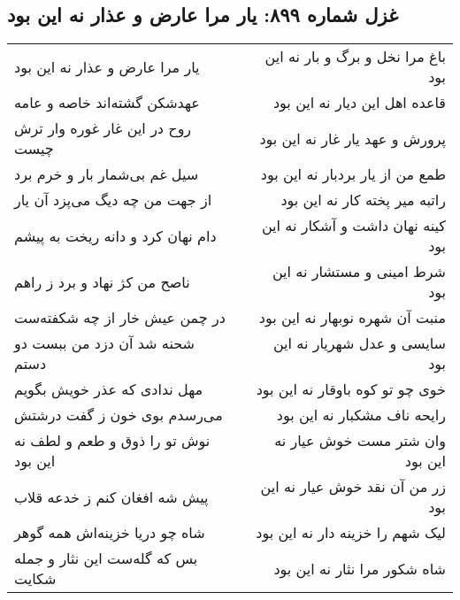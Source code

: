 \begin{center}
\section*{غزل شماره ۸۹۹: یار مرا عارض و عذار نه این بود}
\label{sec:0899}
\begin{longtable}{l p{0.5cm} r}
یار مرا عارض و عذار نه این بود
&&
باغ مرا نخل و برگ و بار نه این بود
\\
عهدشکن گشته‌اند خاصه و عامه
&&
قاعده اهل این دیار نه این بود
\\
روح در این غار غوره وار ترش چیست
&&
پرورش و عهد یار غار نه این بود
\\
سیل غم بی‌شمار بار و خرم برد
&&
طمع من از یار بردبار نه این بود
\\
از جهت من چه دیگ می‌پزد آن یار
&&
راتبه میر پخته کار نه این بود
\\
دام نهان کرد و دانه ریخت به پیشم
&&
کینه نهان داشت و آشکار نه این بود
\\
ناصح من کژ نهاد و برد ز راهم
&&
شرط امینی و مستشار نه این بود
\\
در چمن عیش خار از چه شکفته‌ست
&&
منبت آن شهره نوبهار نه این بود
\\
شحنه شد آن دزد من ببست دو دستم
&&
سایسی و عدل شهریار نه این بود
\\
مهل ندادی که عذر خویش بگویم
&&
خوی چو تو کوه باوقار نه این بود
\\
می‌رسدم بوی خون ز گفت درشتش
&&
رایحه ناف مشکبار نه این بود
\\
نوش تو را ذوق و طعم و لطف نه این بود
&&
وان شتر مست خوش عیار نه این بود
\\
پیش شه افغان کنم ز خدعه قلاب
&&
زر من آن نقد خوش عیار نه این بود
\\
شاه چو دریا خزینه‌اش همه گوهر
&&
لیک شهم را خزینه دار نه این بود
\\
بس که گله‌ست این نثار و جمله شکایت
&&
شاه شکور مرا نثار نه این بود
\\
\end{longtable}
\end{center}
